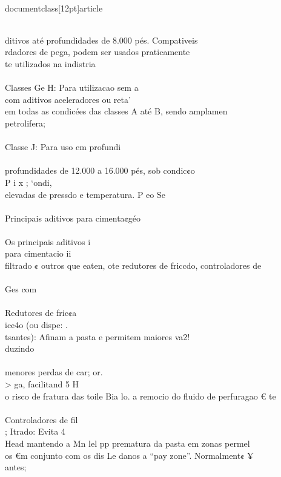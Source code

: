 \\documentclass[12pt]{article}
\begin{document}
\\
ditivos até profundidades de 8.000 pés. Compativeis\\
rdadores de pega, podem ser usados praticamente\\
te utilizados na indistria\\
\\
Classes Ge H: Para utilizacao sem a\\
com aditivos aceleradores ou reta’\\
em todas as condicées das classes A até B, sendo amplamen\\
petrolifera;\\
\\
Classe J: Para uso em profundi\\
\\
profundidades de 12.000 a 16.000 pés, sob condic¢o\\
P i x ; ‘ondi,\\
elevadas de pressdo e temperatura. P eo Se\\
\\
Principais aditivos para cimenta¢géo\\
\\
Os principais aditivos i\\
para cimentacio ii\\
filtrado ¢ outros que eaten, ote redutores de friccdo, controladores de\\
\\
Ges com\\
\\
Redutores de fric¢a\\
ic¢4o (ou dispe: .\\
tsantes): Afinam a pasta e permitem maiores va2!\\
duzindo\\
\\
menores perdas de car; or.\\
> ga, facilitand 5 H\\
o risco de fratura das toile Bia lo. a remocio do fluido de perfuragao € te\\
\\
Controladores de fil\\
; Itrado: Evita 4\\
Head mantendo a Mn lel pp prematura da pasta em zonas permel\\
os €m conjunto com os dis Le danos a “pay zone”. Normalment¢ ¥\\
antes;\\
\\
\end{document}
